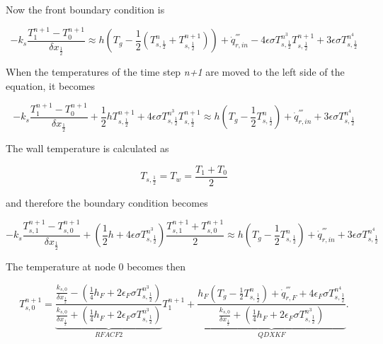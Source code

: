 Now the front boundary condition is

\begin{equation}
\label{bc_front_2}
  -k_s \frac{T_1^{n+1}-T_0^{n+1}}{\delta x_{\frac{1}{2}}}
  \approx h(T_g - \frac{1}{2}(T_{s,\frac{1}{2}}^n+T_{s,\frac{1}{2}}^{n+1})) +
  \dot{q}_{r, in}^{'''}-4\epsilon\sigma T_{s,\frac{1}{2}}^{n^3}T_{s,\frac{1}{2}}^{n+1} + 3\epsilon\sigma T_{s,\frac{1}{2}}^{n^4}
\end{equation}

When the temperatures of the time step \textit{n+1} are moved to the left side of the equation, it becomes

\begin{equation}
\label{bc_front_3}
  -k_s \frac{T_1^{n+1}-T_0^{n+1}}{\delta x_{\frac{1}{2}}} + \frac{1}{2}hT_{s,\frac{1}{2}}^{n+1} + 4\epsilon\sigma T_{s,\frac{1}{2}}^{n^3} T_{s,\frac{1}{2}}^{n+1}
  \approx h(T_g - \frac{1}{2}T_{s,\frac{1}{2}}^n) +
  \dot{q}_{r, in}^{'''} + 3\epsilon\sigma T_{s,\frac{1}{2}}^{n^4}
\end{equation}

The wall temperature is calculated as

\begin{equation}
\label{T_front}
  T_{s,\frac{1}{2}} = T_w = \frac{T_1+T_0}{2}
\end{equation}

and therefore the boundary condition becomes

\begin{equation}
\label{bc_front_4}
  -k_s \frac{T_{s,1}^{n+1}-T_{s,0}^{n+1}}{\delta x_{\frac{1}{2}}} + (\frac{1}{2}h+ 4\epsilon\sigma T_{s,\frac{1}{2}}^{n^3}) \frac{T_{s,1}^{n+1}+T_{s,0}^{n+1}}{2}
  \approx h(T_g - \frac{1}{2}T_{s,\frac{1}{2}}^n) +
  \dot{q}_{r, in}^{'''} + 3\epsilon\sigma T_{s,\frac{1}{2}}^{n^4}
\end{equation}

The temperature at node 0 becomes then

\begin{equation}
\label{T0}
  T_{s,0}^{n+1} = \underbrace{\frac{\frac{k_{s,0}}{\delta x_{\frac{1}{2}}}-(\frac{1}{4}h_F+2\epsilon_F \sigma T_{s,\frac{1}{2}}^{n^3})}{\frac{k_{s,0}}{\delta x_{\frac{1}{2}}}+(\frac{1}{4}h_F+2\epsilon_F \sigma T_{s,\frac{1}{2}}^{n^3})}}_{RFACF2} T_1^{n+1}+
 \underbrace{\frac{h_F(T_g-\frac{1}{2}T_{s,\frac{1}{2}}^n)+\dot{q}_{r,F}^{'''}+4\epsilon_F \sigma T_{s,\frac{1}{2}}^{n^4}}{\frac{k_{s,0}}{\delta x_{\frac{1}{2}}}+(\frac{1}{4}h_F+2\epsilon_F \sigma T_{s,\frac{1}{2}}^{n^3})}}_{QDXKF}.
\end{equation}


